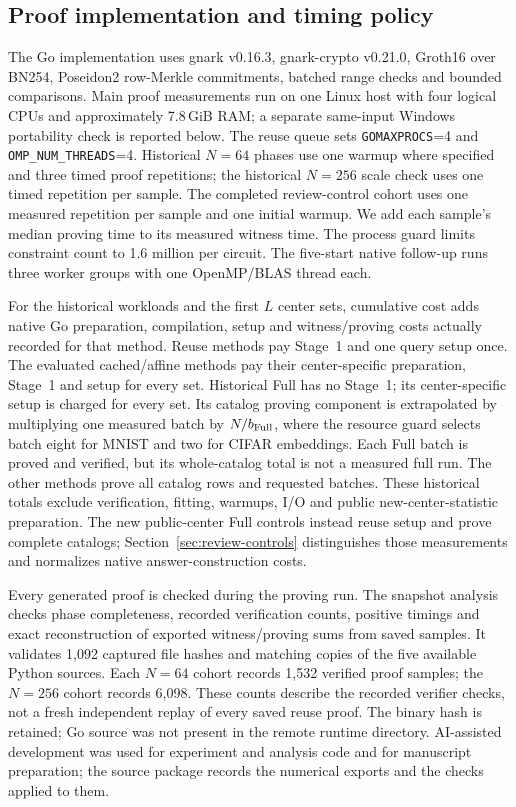 \subsection{Proof implementation and timing policy}\label{app:historical-implementation}
The Go implementation uses gnark v0.16.3, gnark-crypto v0.21.0, Groth16 over BN254, Poseidon2 row-Merkle commitments, batched range checks and bounded comparisons. Main proof measurements run on one Linux host with four logical CPUs and approximately 7.8\,GiB RAM; a separate same-input Windows portability check is reported below. The reuse queue sets \texttt{GOMAXPROCS}=4 and \texttt{OMP\_NUM\_THREADS}=4. Historical $N=64$ phases use one warmup where specified and three timed proof repetitions; the historical $N=256$ scale check uses one timed repetition per sample. The completed review-control cohort uses one measured repetition per sample and one initial warmup. We add each sample's median proving time to its measured witness time. The process guard limits constraint count to 1.6 million per circuit. The five-start native follow-up runs three worker groups with one OpenMP/BLAS thread each.

For the historical workloads and the first $L$ center sets, cumulative cost adds native Go preparation, compilation, setup and witness/proving costs actually recorded for that method. Reuse methods pay Stage~1 and one query setup once. The evaluated cached/affine methods pay their center-specific preparation, Stage~1 and setup for every set. Historical Full has no Stage~1; its center-specific setup is charged for every set. Its catalog proving component is extrapolated by multiplying one measured batch by $N/b_{\rm Full}$, where the resource guard selects batch eight for MNIST and two for CIFAR embeddings. Each Full batch is proved and verified, but its whole-catalog total is not a measured full run. The other methods prove all catalog rows and requested batches. These historical totals exclude verification, fitting, warmups, I/O and public new-center-statistic preparation. The new public-center Full controls instead reuse setup and prove complete catalogs; Section~\ref{sec:review-controls} distinguishes those measurements and normalizes native answer-construction costs.

Every generated proof is checked during the proving run. The snapshot analysis checks phase completeness, recorded verification counts, positive timings and exact reconstruction of exported witness/proving sums from saved samples. It validates 1,092 captured file hashes and matching copies of the five available Python sources. Each $N=64$ cohort records 1,532 verified proof samples; the $N=256$ cohort records 6,098. These counts describe the recorded verifier checks, not a fresh independent replay of every saved reuse proof. The binary hash is retained; Go source was not present in the remote runtime directory. AI-assisted development was used for experiment and analysis code and for manuscript preparation; the source package records the numerical exports and the checks applied to them.

